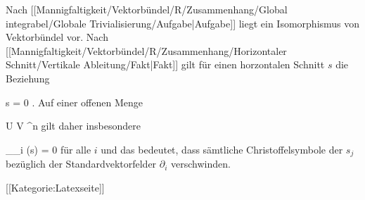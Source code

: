 Nach
[[Mannigfaltigkeit/Vektorbündel/R/Zusammenhang/Global integrabel/Globale Trivialisierung/Aufgabe|Aufgabe]]
liegt ein Isomorphismus von Vektorbündel vor. Nach
[[Mannigfaltigkeit/Vektorbündel/R/Zusammenhang/Horizontaler Schnitt/Vertikale Ableitung/Fakt|Fakt]]
gilt für einen horzontalen Schnitt $s$ die Beziehung

\mavergleichskette
{\vergleichskette
{ \nabla s
}
{ = }{ 0
}
{  }{
}
{    }{
}
{   }{
}
}
{}{}{.}
Auf einer offenen Menge

\mavergleichskette
{\vergleichskette
{ U
}
{ \cong }{ V
}
{ \subseteq }{  \R^n
}
{    }{
}
{   }{
}
}
{}{}{}
gilt daher insbesondere

\mavergleichskettedisp
{\vergleichskette
{ \nabla_{\partial_i} (s)
}
{ =} { 0
}
{ } {
}
{ } {
}
{ } {
}
}
{}{}{}
für alle $i$  und das bedeutet, dass sämtliche Christoffelsymbole der
$s_j$  bezüglich der Standardvektorfelder $\partial_i$  verschwinden.

 [[Kategorie:Latexseite]]
